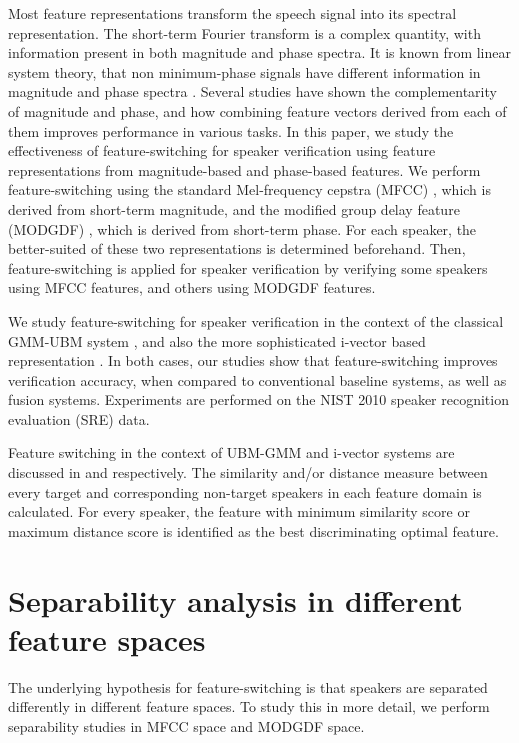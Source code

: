 \documentclass{article}
\begin{document}
Most feature representations transform the speech signal into its spectral
representation. The short-term Fourier transform is a complex quantity, with
information present in both magnitude and phase spectra. It is known from linear
system theory, that non minimum-phase signals have different information in
magnitude and phase spectra \cite{oppenheim}. Several studies \cite{ph1, ph2, mgd_complement}
have shown the complementarity of magnitude and phase, and how combining feature
vectors derived from each of them improves performance in various tasks. In this
paper, we study the effectiveness of feature-switching for speaker verification
using feature representations from magnitude-based and phase-based features. We
perform feature-switching using the standard Mel-frequency cepstra (MFCC)
\cite{mfcc}, which is derived from short-term magnitude, and the modified group delay feature
(MODGDF) \cite{hegdeModgdf}, which is derived from short-term phase. For each speaker, the
better-suited of these two representations is determined beforehand. Then,
feature-switching is applied for speaker verification by verifying some speakers
using MFCC features, and others using MODGDF features.

We study feature-switching for speaker verification in the context of the
classical GMM-UBM system \cite{reynoldsAdaptedGMM}, and also the more
sophisticated i-vector based representation \cite{dehak_ivector}. In both cases,
our studies show that feature-switching improves verification accuracy, when compared to
conventional baseline systems, as well as fusion systems. Experiments are performed on the
NIST 2010 speaker recognition evaluation (SRE) \cite{nist2010SRE} data.

Feature switching in the context of UBM-GMM and i-vector systems are discussed in  \cite{padmanInterspeech2010} and \cite{asha} respectively. The similarity and/or distance measure between every target and corresponding non-target speakers in each feature domain is calculated. For every speaker, the feature with minimum similarity score or maximum distance score is identified as the best discriminating optimal feature. 


\section{Separability analysis in different feature spaces}
\label{sec:separability}
The underlying hypothesis for feature-switching is that speakers are separated
differently in different feature spaces. To study this in more detail, we
perform separability studies in MFCC space and MODGDF space.
\end{document}
